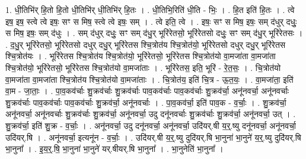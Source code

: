 \documentclass[17pt]{extarticle}
\begin{document}
1. धी॒तिभि॑र् हि॒तो हि॒तो धी॒तिभि॑र् धी॒तिभि॑र् हि॒तः । . धी॒तिभि॒रिति॑ धी॒ति - भिः॒ । . हि॒त इति॑ हि॒तः । . त्वे इष॒ इष॒ स्त्वे त्वे इषः॒ सꣳ स मिष॒ स्त्वे त्वे इषः॒ सम् । . त्वे इति॒ त्वे । . इषः॒ सꣳ स मिष॒ इषः॒ सम् द॑धुर् दधुः॒ स मिष॒ इषः॒ सम् द॑धुः । . सम् द॑धुर् दधुः॒ सꣳ सम् द॑धु॒र् भूरि॑रेतसो॒ भूरि॑रेतसो दधुः॒ सꣳ सम् द॑धु॒र् भूरि॑रेतसः । . द॒धु॒र् भूरि॑रेतसो॒ भूरि॑रेतसो दधुर् दधु॒र् भूरि॑रेतस श्चि॒त्रोत॑य श्चि॒त्रोत॑यो॒ भूरि॑रेतसो दधुर् दधु॒र् भूरि॑रेतस श्चि॒त्रोत॑यः । . भूरि॑रेतस श्चि॒त्रोत॑य श्चि॒त्रोत॑यो॒ भूरि॑रेतसो॒ भूरि॑रेतस श्चि॒त्रोत॑यो वा॒मजा॑ता वा॒मजा॑ता श्चि॒त्रोत॑यो॒ भूरि॑रेतसो॒ भूरि॑रेतस श्चि॒त्रोत॑यो वा॒मजा॑ताः । . भूरि॑रेतस॒ इति॒ भूरि॑ - रे॒त॒सः॒ । . चि॒त्रोत॑यो वा॒मजा॑ता वा॒मजा॑ता श्चि॒त्रोत॑य श्चि॒त्रोत॑यो वा॒मजा॑ताः । . चि॒त्रोत॑य॒ इति॑ चि॒त्र - ऊ॒त॒यः॒ । . वा॒मजा॑ता॒ इति॑ वा॒म - जा॒ताः॒ । . पा॒व॒कव॑र्चाः शु॒क्रव॑र्चाः शु॒क्रव॑र्चाः पाव॒कव॑र्चाः पाव॒कव॑र्चाः शु॒क्रव॑र्चा॒ अनू॑नवर्चा॒ अनू॑नवर्चाः शु॒क्रव॑र्चाः पाव॒कव॑र्चाः पाव॒कव॑र्चाः शु॒क्रव॑र्चा॒ अनू॑नवर्चाः । . पा॒व॒कव॑र्चा॒ इति॑ पाव॒क - व॒र्चाः॒ । . शु॒क्रव॑र्चा॒ अनू॑नवर्चा॒ अनू॑नवर्चाः शु॒क्रव॑र्चाः शु॒क्रव॑र्चा॒ अनू॑नवर्चा॒ उदु दनू॑नवर्चाः शु॒क्रव॑र्चाः शु॒क्रव॑र्चा॒ अनू॑नवर्चा॒ उत् । . शु॒क्रव॑र्चा॒ इति॑ शु॒क्र - व॒र्चाः॒ । . अनू॑नवर्चा॒ उदु दनू॑नवर्चा॒ अनू॑नवर्चा॒ उदि॑यर्.षी य॒र्॒.ष्यु दनू॑नवर्चा॒ अनू॑नवर्चा॒ उदि॑यर्.षि । . अनू॑नवर्चा॒ इत्यनू॑न - व॒र्चाः॒ । . उदि॑यर्.षी य॒र्॒.ष्यु दुदि॑यर्.षि भा॒नुना॑ भा॒नुने॑ य॒र्॒.ष्यु दुदि॑यर्.षि भा॒नुना᳚ । . इ॒य॒र्॒.षि॒ भा॒नुना॑ भा॒नुने॑ यर्.षीयर्.षि भा॒नुना᳚ । . भा॒नुनेति॑ भा॒नुना᳚ । \newline
\end{document}
